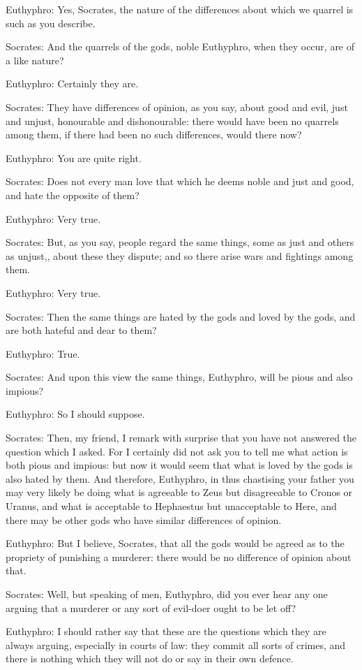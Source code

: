 Euthyphro: Yes, Socrates, the nature of the differences about which we quarrel is such as you describe.

Socrates: And the quarrels of the gods, noble Euthyphro, when they occur, are of a like nature?

Euthyphro: Certainly they are.

Socrates: They have differences of opinion, as you say, about good and evil, just and unjust, honourable and dishonourable: there would have been no quarrels among them, if there had been no such differences, would there now?

Euthyphro: You are quite right.

Socrates: Does not every man love that which he deems noble and just and good, and hate the opposite of them?

Euthyphro: Very true.

Socrates: But, as you say, people regard the same things, some as just and others as unjust,, about these they dispute; and so there arise wars and fightings among them.

Euthyphro: Very true.

Socrates: Then the same things are hated by the gods and loved by the gods, and are both hateful and dear to them?

Euthyphro: True.

Socrates: And upon this view the same things, Euthyphro, will be pious and also impious?

Euthyphro: So I should suppose.

Socrates: Then, my friend, I remark with surprise that you have not answered the question which I asked. For I certainly did not ask you to tell me what action is both pious and impious: but now it would seem that what is loved by the gods is also hated by them. And therefore, Euthyphro, in thus chastising your father you may very likely be doing what is agreeable to Zeus but disagreeable to Cronos or Uranus, and what is acceptable to Hephaestus but unacceptable to Here, and there may be other gods who have similar differences of opinion.

Euthyphro: But I believe, Socrates, that all the gods would be agreed as to the propriety of punishing a murderer: there would be no difference of opinion about that.

Socrates: Well, but speaking of men, Euthyphro, did you ever hear any one arguing that a murderer or any sort of evil-doer ought to be let off?

Euthyphro: I should rather say that these are the questions which they are always arguing, especially in courts of law: they commit all sorts of crimes, and there is nothing which they will not do or say in their own defence.

